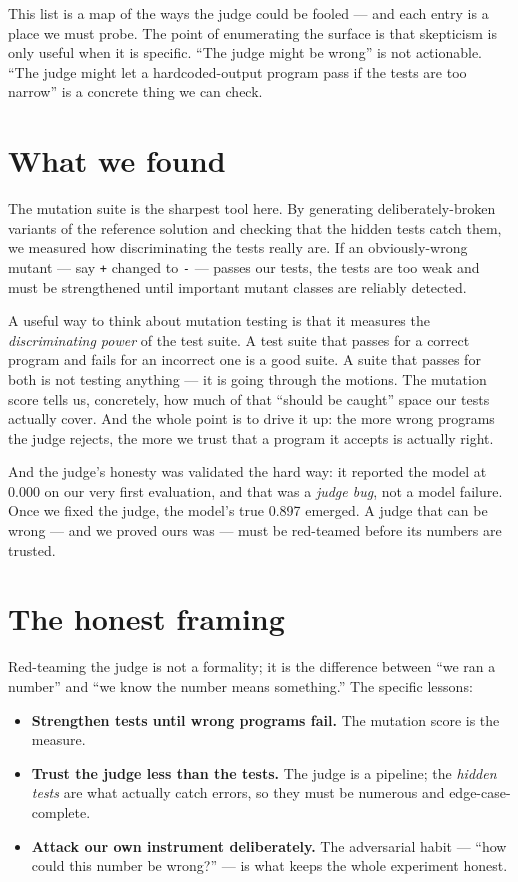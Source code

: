 This list is a map of the ways the judge could be fooled --- and each
entry is a place we must probe. The point of enumerating the surface is
that skepticism is only useful when it is specific. ``The judge might be
wrong'' is not actionable. ``The judge might let a hardcoded-output
program pass if the tests are too narrow'' is a concrete thing we can
check.

\section{What we found}\label{what-we-found}

The mutation suite is the sharpest tool here. By generating
deliberately-broken variants of the reference solution and checking that
the hidden tests catch them, we measured how discriminating the tests
really are. If an obviously-wrong mutant --- say \texttt{+} changed to
\texttt{-} --- passes our tests, the tests are too weak and must be
strengthened until important mutant classes are reliably detected.

A useful way to think about mutation testing is that it measures the
\emph{discriminating power} of the test suite. A test suite that passes
for a correct program and fails for an incorrect one is a good suite. A
suite that passes for both is not testing anything --- it is going
through the motions. The mutation score tells us, concretely, how much
of that ``should be caught'' space our tests actually cover. And the
whole point is to drive it up: the more wrong programs the judge
rejects, the more we trust that a program it accepts is actually right.

And the judge's honesty was validated the hard way: it reported the
model at 0.000 on our very first evaluation, and that was a \emph{judge
bug}, not a model failure. Once we fixed the judge, the model's true
0.897 emerged. A judge that can be wrong --- and we proved ours was ---
must be red-teamed before its numbers are trusted.

\section{The honest framing}\label{the-honest-framing}

Red-teaming the judge is not a formality; it is the difference between
``we ran a number'' and ``we know the number means something.'' The
specific lessons:

\begin{itemize}
\tightlist
\item
  \textbf{Strengthen tests until wrong programs fail.} The mutation
  score is the measure.
\item
  \textbf{Trust the judge less than the tests.} The judge is a pipeline;
  the \emph{hidden tests} are what actually catch errors, so they must
  be numerous and edge-case-complete.
\item
  \textbf{Attack our own instrument deliberately.} The adversarial habit
  --- ``how could this number be wrong?'' --- is what keeps the whole
  experiment honest.
\end{itemize}

